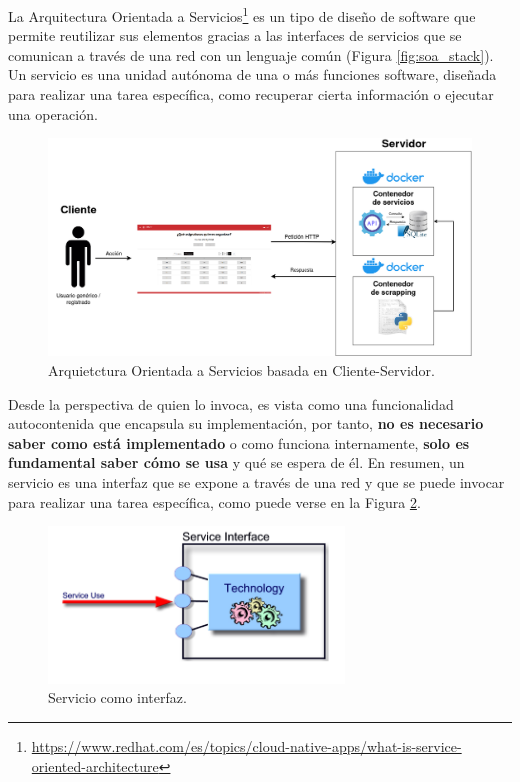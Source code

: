 La Arquitectura Orientada a Servicios\footnote{\url{https://www.redhat.com/es/topics/cloud-native-apps/what-is-service-oriented-architecture}} es un tipo de diseño de software que permite reutilizar sus elementos gracias a las interfaces de servicios que se comunican a través de una red con un lenguaje común (Figura \ref{fig:soa_stack}). Un servicio es una unidad autónoma de una o más funciones software, diseñada para realizar una tarea específica, como recuperar cierta información o ejecutar una operación.\newline

\begin{figure}[H]
    \centering
    \includegraphics[width=1\textwidth]{./imagenes/Arq_Soft_informal.png}
    \caption{Arquietctura Orientada a Servicios basada en Cliente-Servidor.}
    \label{fig:soa}
\end{figure}

Desde la perspectiva de quien lo invoca, es vista como una funcionalidad autocontenida que encapsula su implementación, por tanto, \textbf{no es necesario saber como está implementado} o como funciona internamente, \textbf{solo es fundamental saber cómo se usa} y qué se espera de él. En resumen, un servicio es una interfaz que se expone a través de una red y que se puede invocar para realizar una tarea específica, como puede verse en la Figura \ref{fig:soa_interface}.\newline

\begin{figure}[H]
    \centering
    \includegraphics[width=0.7\textwidth]{./imagenes/Interfaz_SOA.png}
    \caption{Servicio como interfaz.}
    \label{fig:soa_interface}
\end{figure}

